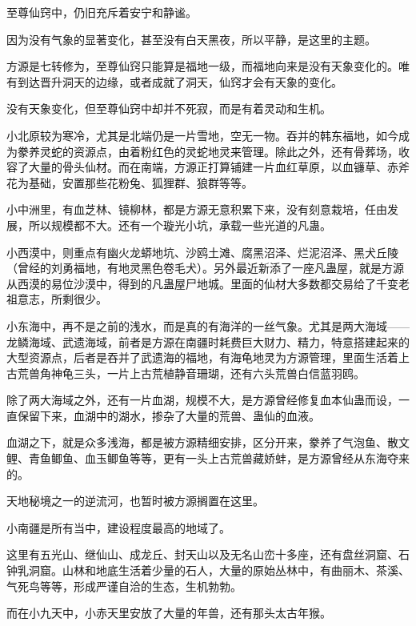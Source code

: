 
\begin{this_body}

至尊仙窍中，仍旧充斥着安宁和静谧。

因为没有气象的显著变化，甚至没有白天黑夜，所以平静，是这里的主题。

方源是七转修为，至尊仙窍只能算是福地一级，而福地向来是没有天象变化的。唯有到达晋升洞天的边缘，或者成就了洞天，仙窍才会有天象的变化。

没有天象变化，但至尊仙窍中却并不死寂，而是有着灵动和生机。

小北原较为寒冷，尤其是北端仍是一片雪地，空无一物。吞并的韩东福地，如今成为豢养灵蛇的资源点，由着粉红色的灵蛇地灵来管理。除此之外，还有骨葬场，收容了大量的骨头仙材。而在南端，方源正打算铺建一片血红草原，以血镰草、赤斧花为基础，安置那些花粉兔、狐狸群、狼群等等。

小中洲里，有血芝林、镜柳林，都是方源无意积累下来，没有刻意栽培，任由发展，所以规模都不大。还有一个璇光小坑，承载一些光道的凡蛊。

小西漠中，则重点有幽火龙蟒地坑、沙鸥土滩、腐黑沼泽、烂泥沼泽、黑犬丘陵（曾经的刘勇福地，有地灵黑色卷毛犬）。另外最近新添了一座凡蛊屋，就是方源从西漠的易位沙漠中，得到的凡蛊屋尸地城。里面的仙材大多数都交易给了千变老祖意志，所剩很少。

小东海中，再不是之前的浅水，而是真的有海洋的一丝气象。尤其是两大海域——龙鳞海域、武遗海域，前者是方源在南疆时耗费巨大财力、精力，特意搭建起来的大型资源点，后者是吞并了武遗海的福地，有海龟地灵为方源管理，里面生活着上古荒兽角神龟三头，一片上古荒植静音珊瑚，还有六头荒兽白信蓝羽鸥。

除了两大海域之外，还有一片血湖，规模不大，是方源曾经修复血本仙蛊而设，一直保留下来，血湖中的湖水，掺杂了大量的荒兽、蛊仙的血液。

血湖之下，就是众多浅海，都是被方源精细安排，区分开来，豢养了气泡鱼、散文鲤、青鱼鲫鱼、血玉鲫鱼等等，更有一头上古荒兽藏娇蚌，是方源曾经从东海夺来的。

天地秘境之一的逆流河，也暂时被方源搁置在这里。

小南疆是所有当中，建设程度最高的地域了。

这里有五光山、继仙山、成龙丘、封天山以及无名山峦十多座，还有盘丝洞窟、石钟乳洞窟。山林和地底生活着少量的石人，大量的原始丛林中，有曲丽木、茶溪、气死鸟等等，形成严谨自洽的生态，生机勃勃。

而在小九天中，小赤天里安放了大量的年兽，还有那头太古年猴。


\end{this_body}
